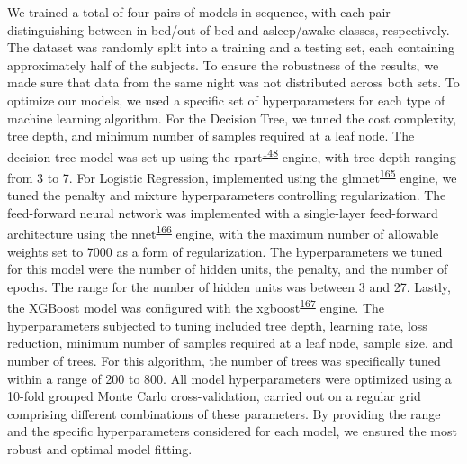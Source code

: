 \documentclass[
  10pt,
]{scrbook}
\begin{document}
We trained a total of four pairs of models in sequence, with each pair
distinguishing between in-bed/out-of-bed and asleep/awake classes,
respectively. The dataset was randomly split into a training and a
testing set, each containing approximately half of the subjects. To
ensure the robustness of the results, we made sure that data from the
same night was not distributed across both sets. To optimize our models,
we used a specific set of hyperparameters for each type of machine
learning algorithm. For the Decision Tree, we tuned the cost complexity,
tree depth, and minimum number of samples required at a leaf node. The
decision tree model was set up using the
rpart\textsuperscript{\protect\hyperlink{ref-rpart}{148}} engine, with
tree depth ranging from 3 to 7. For Logistic Regression, implemented
using the
glmnet\textsuperscript{\protect\hyperlink{ref-friedman_glmnet_2010}{165}}
engine, we tuned the penalty and mixture hyperparameters controlling
regularization. The feed-forward neural network was implemented with a
single-layer feed-forward architecture using the
nnet\textsuperscript{\protect\hyperlink{ref-nnet}{166}} engine, with the
maximum number of allowable weights set to 7000 as a form of
regularization. The hyperparameters we tuned for this model were the
number of hidden units, the penalty, and the number of epochs. The range
for the number of hidden units was between 3 and 27. Lastly, the XGBoost
model was configured with the
xgboost\textsuperscript{\protect\hyperlink{ref-xgboost}{167}} engine.
The hyperparameters subjected to tuning included tree depth, learning
rate, loss reduction, minimum number of samples required at a leaf node,
sample size, and number of trees. For this algorithm, the number of
trees was specifically tuned within a range of 200 to 800. All model
hyperparameters were optimized using a 10-fold grouped Monte Carlo
cross-validation, carried out on a regular grid comprising different
combinations of these parameters. By providing the range and the
specific hyperparameters considered for each model, we ensured the most
robust and optimal model fitting.
\end{document}
